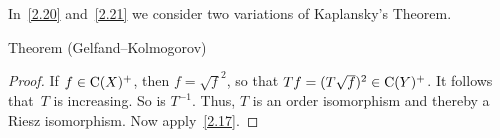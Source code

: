 \documentclass[main.tex]{subfiles}
\begin{document}
In~\ref{2.20} and~\ref{2.21} 
we consider two variations
of Kaplansky's Theorem.
%
%
\begin{psec}{2.20}{Theorem (Gelfand--Kolmogorov)}
\end{psec}
\begin{proof}
If $f\in\mathrm{C}(X)^+$,
then $f = \sqrt{f}^2$,
so that $Tf = \smash{(T\sqrt{f})^2}\in \mathrm{C}(Y)^+$.
It follows that~$T$
is increasing.
So is $T^{-1}$.
Thus, $T$ is an order isomorphism
and thereby a Riesz isomorphism.
Now apply~\ref{2.17}.
\end{proof}
\clearpage
\end{document}
